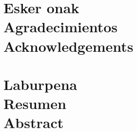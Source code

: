 \documentclass[a4paper, 11pt]{memoir}
\title{\izenburua}
\author{\egilea}
\begin{document}
	
	
%



% 

%
%
%


\cleardoublepage
\frontmatter


\chapter*{Esker onak \\ Agradecimientos \\ Acknowledgements}
% 


\cleardoublepage


\chapter*{Laburpena \\ Resumen \\ Abstract}
% 

\cleardoublepage


\tableofcontents
\clearpage
\listoffigures
\clearpage
\listoftables
\clearpage


\end{document}
